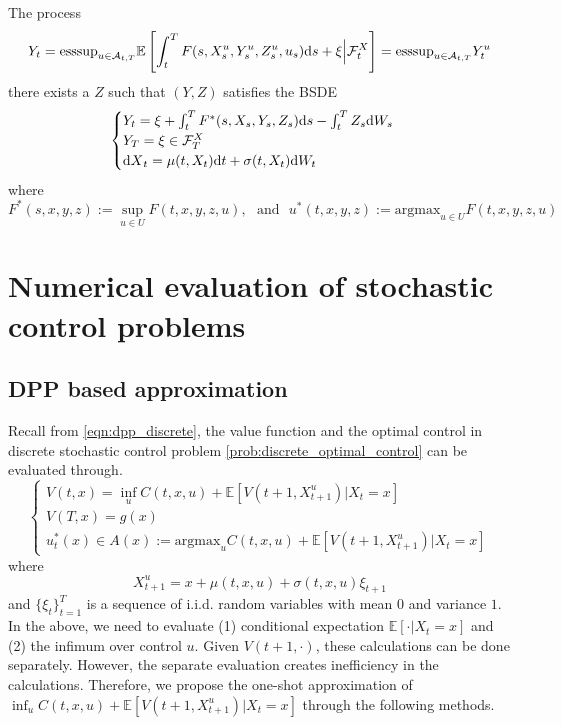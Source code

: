 \documentclass[11pt]{book}
\newcommand{\dt}{\text{\normalfont d}t}
\newcommand{\ds}{\text{\normalfont d}s}
\newcommand{\dX}{\text{\normalfont d}X}
\newcommand{\dW}{\text{\normalfont d}W}
\begin{document}
\begin{thm}
The process 
\begin{equation}
Y_t=\mathrm{esssup}_{u\in\mathcal{A}_{t,T}}\mathbb{E}\left[\int_t^TF(s,X^u_s,Y^u_s,Z^u_s,u_s){{\ds}}+\xi\Big|\mathcal{F}^X_t\right]=\mathrm{esssup}_{u\in\mathcal{A}_{t,T}}Y_t^u
\end{equation}
there exists a $Z$ such that $(Y,Z)$
satisfies the BSDE
\begin{equation}
\begin{cases}
Y_t=\xi+\int_t^TF^*(s,X_s,Y_s,Z_s){{\ds}}-\int_t^TZ_s\dW_s\\
Y_T=\xi\in\mathcal{F}^{X}_T\\
{\dX}_t=\mu(t,X_t){{\dt}}+\sigma(t,X_t)\dW_t
\end{cases}
\end{equation}
where
\begin{equation}
F^*(s,x,y,z):=\sup_{u\in U}F(t,x,y,z,u),~~~\textrm{and}~~~u^*(t,x,y,z):=\mathrm{argmax}_{u\in U}F(t,x,y,z,u)
\end{equation}
\end{thm}
\chapter{Numerical evaluation of stochastic control problems}



\section{DPP based approximation}
Recall from \eqref{eqn:dpp_discrete}, the value function and the optimal control in discrete stochastic control problem \eqref{prob:discrete_optimal_control} can be evaluated through.
\begin{equation}\label{eqn:dpp_discrete_numerical}
    \begin{cases}
        V(t,x)= \inf_{u}
    C(t,x,u) + \mathbb{E}[V(t+1,X^u_{t+1})|X_t=x]\\
    V(T,x)=g(x)\\
    u^*_t(x)\in A(x):=\textrm{argmax}_{u}
    C(t,x,u) + \mathbb{E}[V(t+1,X^u_{t+1})|X_t=x]
    \end{cases}
\end{equation}
where
\begin{equation}
    X^u_{t+1}=x+\mu(t,x,u)+\sigma(t,x,u)\xi_{t+1}
\end{equation}
and $\{\xi_t\}_{t=1}^T$ is a sequence of i.i.d. random variables with mean $0$ and variance $1$. In the above, we need to evaluate (1) conditional expectation $\mathbb{E}[\cdot|X_t=x]$ and (2) the infimum over control $u$. Given $V(t+1,\cdot)$, these calculations can be done separately. However, the separate evaluation creates inefficiency in the calculations. Therefore, we propose the one-shot approximation of $\inf_{u}C(t,x,u) + \mathbb{E}[V(t+1,X^u_{t+1})|X_t=x]$ through the following methods. 
\end{document}
